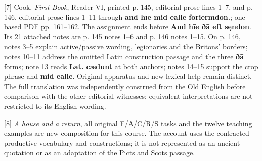 [7] Cook, \emph{First Book}, Reader VI, printed p. 145, editorial prose lines 1–7, and p. 146, editorial prose lines 1–11 through \textbf{and hīe mid ealle foriermdon.}; one-based PDF pp. 161–162. The assignment ends before \textbf{And hīe ðā eft sęndon}. Its 21 attached notes are p. 145 notes 1–6 and p. 146 notes 1–15. On p. 146, notes 3–5 explain active/\allowbreak{}passive wording, legionaries and the Britons' borders; notes 10–11 address the omitted Latin construction passage and the three \textbf{ðā} forms; note 13 reads \textbf{Lat. cædunt} at both anchors; notes 14–15 support the crop phrase and \textbf{mid ealle}. Original apparatus and new lexical help remain distinct. The full translation was independently construed from the Old English before comparison with the other editorial witnesses; equivalent interpretations are not restricted to its English wording.

[8] \emph{A house and a return}, all original F/\allowbreak{}A/\allowbreak{}C/\allowbreak{}R/\allowbreak{}S tasks and the twelve teaching examples are new composition for this course. The account uses the contracted productive vocabulary and constructions; it is not represented as an ancient quotation or as an adaptation of the Picts and Scots passage.

\endgroup

